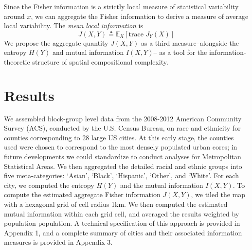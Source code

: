 \documentclass[english]{scrartcl}
\newcommand\E[0]{\mathbb{E}}
\begin{document}
	Since the Fisher information is a strictly local measure of statistical variability around $x$, we can aggregate the Fisher information to derive a measure of average local variability. The \emph{mean local information} is 
	\begin{equation}
	J(X,Y) \triangleq \E_X[\text{trace }J_Y(X)]
	\end{equation} 
	We propose the aggregate quantity $J(X,Y)$ as a third  measure--alongside the entropy $H(Y)$ and mutual information $I(X,Y)$-- as a tool for the information-theoretic structure of spatial compositional complexity. 

\section{Results}
	We assembled block-group level data from the 2008-2012 American Community Survey (ACS), conducted by the U.S. Census Bureau, on race and ethnicity for counties corresponding to 28 large US cities. At this early stage, the counties used were chosen to correspond to the most densely populated urban cores; in future developments we could standardize to conduct analyses for Metropolitan Statistical Areas. We then aggregated the detailed racial and ethnic groups into five meta-categories: `Asian', `Black', `Hispanic', `Other', and `White'. For each city, we computed the entropy $H(Y)$ and the mutual information $I(X,Y)$. To compute the estimated aggregate Fisher information $J(X,Y)$, we tiled the map with a hexagonal grid of cell radius 1km. We then computed the estimated mutual information within each grid cell, and averaged the results weighted by population population. A technical specification of this approach is provided in Appendix 1, and a complete summary of cities and their associated information measures is provided in Appendix 3. 
		
\end{document}
